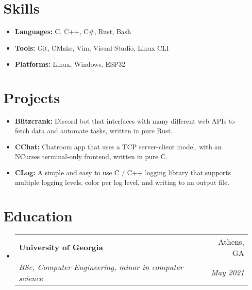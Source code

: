 \documentclass[letterpaper,11pt]{article}
\makeatletter
\newcommand{\resumeSubheading}[4]{
  \vspace{-1pt}\item
    \begin{tabular*}{0.97\textwidth}{l@{\extracolsep{\fill}}r}
      \textbf{#1} & #2 \\
      \textit{\small#3} & \textit{\small #4} \\
    \end{tabular*}\vspace{-5pt}
}
\newcommand{\resumeSubHeadingListStart}{\begin{itemize}[leftmargin=*]}
\newcommand{\resumeSubHeadingListEnd}{\end{itemize}}
\makeatother
\begin{document}
\section{Skills}
\begin{itemize}
\setlength\itemsep{-0.25em}
\item
\textbf{Languages:} C, C++, C\#, Rust, Bash
\item
\textbf{Tools:} Git, CMake, Vim, Visual Studio, Linux CLI
\item
\textbf{Platforms:} Linux, Windows, ESP32
\end{itemize}
\section{Projects}
\begin{itemize}
\setlength\itemsep{-0.25em}
\item 
\textbf{Blitzcrank:} Discord bot that interfaces with many different web APIs to fetch data and automate tasks, written in pure Rust.
\item
\textbf{CChat:} Chatroom app that uses a TCP server-client model, with an NCurses terminal-only frontend, written in pure C.
\item
\textbf{CLog:} A simple and easy to use C / C++ logging library that supports multiple logging levels, color per log level, and writing to an output file. \\
\end{itemize}

\section{Education}
  \resumeSubHeadingListStart
    \resumeSubheading
      {University of Georgia}{Athens, GA}
      {BSc, Computer Engineering, minor in computer science}{May 2021 }
  \resumeSubHeadingListEnd
\end{document}
